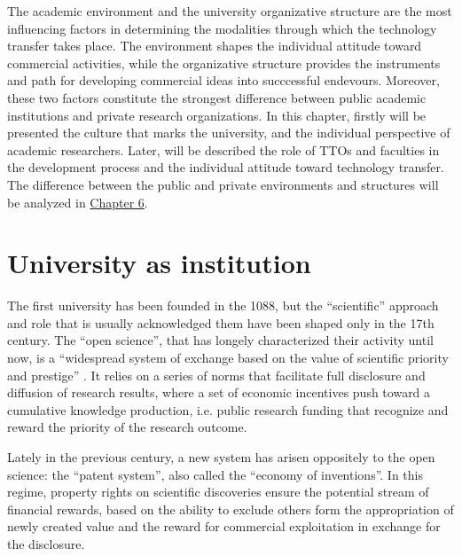 

\label{Chapter2} %

The academic environment and the university organizative structure are the most influencing factors in determining the modalities through which the technology transfer takes place. The environment shapes the individual attitude toward commercial activities, while the organizative structure provides the instruments and path for developing commercial ideas into succcessful endevours. Moreover, these two factors constitute the strongest difference between public academic institutions and private research organizations. In this chapter, firstly will be presented the culture that marks the university, and the individual perspective of academic researchers. Later, will be described the role of TTOs and faculties in the development process and the individual attitude toward technology transfer. The difference between the public and private environments and structures will be analyzed in \hyperref[Chapter6]{Chapter 6}.

\section{University as institution}

The first university has been founded in the 1088, but the \enquote{scientific} approach and role that is usually acknowledged them have been shaped only in the 17th century. The \enquote{open science}, that has longely characterized their activity until now, is a \enquote{widespread system of exchange based on the value of scientific priority and prestige} \citep{Murray2005}. It relies on a series of norms that facilitate full disclosure and diffusion of research results, where a set of economic incentives push toward a cumulative knowledge production, i.e. public research funding that recognize and reward the priority of the research outcome.

Lately in the previous century, a new system has arisen oppositely to the open science: the \enquote{patent system}, also called the \enquote{economy of inventions}. In this regime, property rights on scientific discoveries ensure the potential stream of financial rewards, based on the ability to exclude others form the appropriation of newly created value and the reward for commercial exploitation in exchange for the disclosure. 

